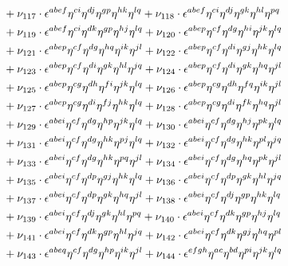\documentclass[a4paper,12pt, DIV=14, BCOR=5mm, twoside, headsepline, numbers=noenddot]{scrbook}
\begin{document}
\begin{align}
\begin{alignedat}{2}
& & &\hphantom{=}
+\nu_{117}\cdot\epsilon^{abef}\eta^{ci}\eta^{dj}\eta^{gp}\eta^{hk}\eta^{lq}+\nu_{118}\cdot\epsilon^{abef}\eta^{ci}\eta^{dj}\eta^{gk}\eta^{hl}\eta^{pq}\\
& & &\hphantom{=}
+\nu_{119}\cdot\epsilon^{abef}\eta^{ci}\eta^{dk}\eta^{gp}\eta^{hj}\eta^{lq}+\nu_{120}\cdot\epsilon^{abep}\eta^{cf}\eta^{dg}\eta^{hi}\eta^{jk}\eta^{lq}\\
& & &\hphantom{=}
+\nu_{121}\cdot\epsilon^{abep}\eta^{cf}\eta^{dg}\eta^{hq}\eta^{ik}\eta^{jl}+\nu_{122}\cdot\epsilon^{abep}\eta^{cf}\eta^{di}\eta^{gj}\eta^{hk}\eta^{lq}\\
& & &\hphantom{=}
+\nu_{123}\cdot\epsilon^{abep}\eta^{cf}\eta^{di}\eta^{gk}\eta^{hl}\eta^{jq}+\nu_{124}\cdot\epsilon^{abep}\eta^{cf}\eta^{di}\eta^{gk}\eta^{hq}\eta^{jl}\\
& & &\hphantom{=}
+\nu_{125}\cdot\epsilon^{abep}\eta^{cg}\eta^{dh}\eta^{fi}\eta^{jk}\eta^{lq}+\nu_{126}\cdot\epsilon^{abep}\eta^{cg}\eta^{dh}\eta^{fq}\eta^{ik}\eta^{jl}\\
& & &\hphantom{=}
+\nu_{127}\cdot\epsilon^{abep}\eta^{cg}\eta^{di}\eta^{fj}\eta^{hk}\eta^{lq}+\nu_{128}\cdot\epsilon^{abep}\eta^{cg}\eta^{di}\eta^{fk}\eta^{hq}\eta^{jl}\\
& & &\hphantom{=}
+\nu_{129}\cdot\epsilon^{abei}\eta^{cf}\eta^{dg}\eta^{hp}\eta^{jk}\eta^{lq}+\nu_{130}\cdot\epsilon^{abei}\eta^{cf}\eta^{dg}\eta^{hj}\eta^{pk}\eta^{lq}\\
& & &\hphantom{=}
+\nu_{131}\cdot\epsilon^{abei}\eta^{cf}\eta^{dg}\eta^{hk}\eta^{pj}\eta^{lq}+\nu_{132}\cdot\epsilon^{abei}\eta^{cf}\eta^{dg}\eta^{hk}\eta^{pl}\eta^{jq}\\
& & &\hphantom{=}
+\nu_{133}\cdot\epsilon^{abei}\eta^{cf}\eta^{dg}\eta^{hk}\eta^{pq}\eta^{jl}+\nu_{134}\cdot\epsilon^{abei}\eta^{cf}\eta^{dg}\eta^{hq}\eta^{pk}\eta^{jl}\\
& & &\hphantom{=}
+\nu_{135}\cdot\epsilon^{abei}\eta^{cf}\eta^{dp}\eta^{gj}\eta^{hk}\eta^{lq}+\nu_{136}\cdot\epsilon^{abei}\eta^{cf}\eta^{dp}\eta^{gk}\eta^{hl}\eta^{jq}\\
& & &\hphantom{=}
+\nu_{137}\cdot\epsilon^{abei}\eta^{cf}\eta^{dp}\eta^{gk}\eta^{hq}\eta^{jl}+\nu_{138}\cdot\epsilon^{abei}\eta^{cf}\eta^{dj}\eta^{gp}\eta^{hk}\eta^{lq}\\
& & &\hphantom{=}
+\nu_{139}\cdot\epsilon^{abei}\eta^{cf}\eta^{dj}\eta^{gk}\eta^{hl}\eta^{pq}+\nu_{140}\cdot\epsilon^{abei}\eta^{cf}\eta^{dk}\eta^{gp}\eta^{hj}\eta^{lq}\\
& & &\hphantom{=}
+\nu_{141}\cdot\epsilon^{abei}\eta^{cf}\eta^{dk}\eta^{gp}\eta^{hl}\eta^{jq}+\nu_{142}\cdot\epsilon^{abei}\eta^{cf}\eta^{dk}\eta^{gj}\eta^{hq}\eta^{pl}\\
& & &\hphantom{=}
+\nu_{143}\cdot\epsilon^{abeq}\eta^{cf}\eta^{dg}\eta^{hp}\eta^{ik}\eta^{jl}+\nu_{144}\cdot\epsilon^{efgh}\eta^{ac}\eta^{bd}\eta^{pi}\eta^{jk}\eta^{lq}
\end{alignedat}
\end{align}
\end{document}
